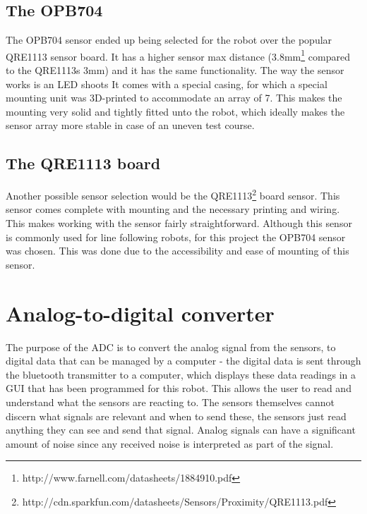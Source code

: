 \subsection{The OPB704}
The OPB704 sensor ended up being selected for the robot over the popular QRE1113 sensor board. It has a higher sensor max distance (3.8mm\footnote{http://www.farnell.com/datasheets/1884910.pdf} compared to the QRE1113s 3mm) and it has the same functionality. The way the sensor works is an LED shoots It comes with a special casing, for which a special mounting unit was 3D-printed to accommodate an array of 7. This makes the mounting very solid and tightly fitted unto the robot, which ideally makes the sensor array more stable in case of an uneven test course.

\subsection{The QRE1113 board}
Another possible sensor selection would be the QRE1113\footnote{http://cdn.sparkfun.com/datasheets/Sensors/Proximity/QRE1113.pdf} board sensor. This sensor comes complete with mounting and the necessary printing and wiring. This makes working with the sensor fairly straightforward. Although this sensor is commonly used for line following robots, for this project the OPB704 sensor was chosen. This was done due to the accessibility and ease of mounting of this sensor.


\section{Analog-to-digital converter}
The purpose of the ADC is to convert the analog signal from the sensors, to digital data that can be managed by a computer - the digital data is sent through the bluetooth transmitter to a computer, which displays these data readings in a GUI that has been programmed for this robot. This allows the user to read and understand what the sensors are reacting to. The sensors themselves cannot discern what signals are relevant and when to send these, the sensors just read anything they can see and send that signal. Analog signals can have a significant amount of noise since any received noise is interpreted as part of the signal.

